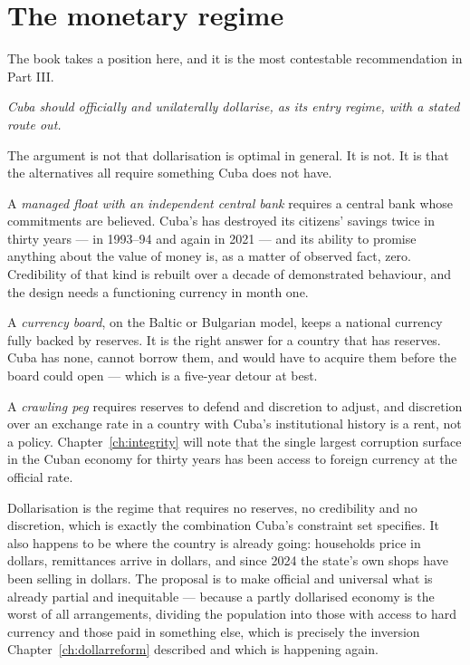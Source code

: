 \section{The monetary regime}

The book takes a position here, and it is the most contestable recommendation in
Part III.

\emph{Cuba should officially and unilaterally dollarise, as its entry regime,
with a stated route out.}

The argument is not that dollarisation is optimal in general. It is not. It is
that the alternatives all require something Cuba does not have.

A \emph{managed float with an independent central bank} requires a central bank
whose commitments are believed. Cuba's has destroyed its citizens' savings twice
in thirty years --- in 1993--94 and again in 2021 --- and its ability to promise
anything about the value of money is, as a matter of observed fact, zero. Credibility
of that kind is rebuilt over a decade of demonstrated behaviour, and the design
needs a functioning currency in month one.

A \emph{currency board}, on the Baltic or Bulgarian model, keeps a national
currency fully backed by reserves. It is the right answer for a country that has
reserves. Cuba has none, cannot borrow them, and would have to acquire them
before the board could open --- which is a five-year detour at best.

A \emph{crawling peg} requires reserves to defend and discretion to adjust, and
discretion over an exchange rate in a country with Cuba's institutional history
is a rent, not a policy. Chapter~\ref{ch:integrity} will note that the single
largest corruption surface in the Cuban economy for thirty years has been access
to foreign currency at the official rate.

Dollarisation is the regime that requires no reserves, no credibility and no
discretion, which is exactly the combination Cuba's constraint set specifies.
It also happens to be where the country is already going: households price in
dollars, remittances arrive in dollars, and since 2024 the state's own shops
have been selling in dollars. The proposal is to make official and universal
what is already partial and inequitable --- because a partly dollarised economy
is the worst of all arrangements, dividing the population into those with access
to hard currency and those paid in something else, which is precisely the
inversion Chapter~\ref{ch:dollarreform} described and which is happening again.

